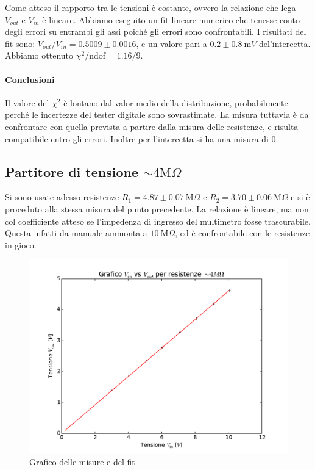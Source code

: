 \documentclass[10pt,a4paper]{article}
\newcommand\ohm{\Omega}
\newcommand\M{\text{M}}
\newcommand\m{\text{m}}
\begin{document}
Come atteso il rapporto tra le tensioni è costante, ovvero la relazione che lega $V_{out}$ e $V_{in}$ è lineare.
Abbiamo eseguito un fit lineare numerico che tenesse conto degli errori su entrambi gli assi poiché gli errori sono confrontabili. I risultati del fit sono: $V_{out}/V_{in}=0.5009 \pm 0.0016$, e un valore pari a $0.2 \pm 0.8 ~ \m V$ del'intercetta. Abbiamo ottenuto  $\chi^2/\text{ndof}= 1.16/9$.

\paragraph{Conclusioni} Il valore del $\chi^2$ è lontano dal valor medio della distribuzione, probabilmente perché le incertezze del tester digitale sono sovrastimate. La misura tuttavia è da confrontare con quella prevista a partire dalla misura delle resistenze, e risulta compatibile entro gli errori. Inoltre per l'intercetta si ha una misura di $0$.

\subsection{Partitore di tensione $\sim4\M\ohm$}
Si sono usate adesso resistenze $R_1=4.87 \pm 0.07 ~\M\ohm$ e $R_2=3.70 \pm 0.06 ~\M\ohm$ e si è proceduto alla stessa misura del punto precedente. La relazione è lineare, ma non col coefficiente atteso se l'impedenza di ingresso del multimetro fosse trascurabile. Questa infatti da manuale ammonta a $10 ~ \M\ohm$, ed è confrontabile con le resistenze in gioco.

\begin{figure}[h]
\centering
	\begin{minipage}[h]{0.35\textwidth}
		\centering
		
	\end{minipage}%
	\begin{minipage}[h]{0.65\textwidth}
		\centering
		\includegraphics[width=1\textwidth]{../grafici/fit_4MOhm.pdf}
		\caption{Grafico delle misure e del fit}
	\end{minipage}
\end{figure}
\end{document}
